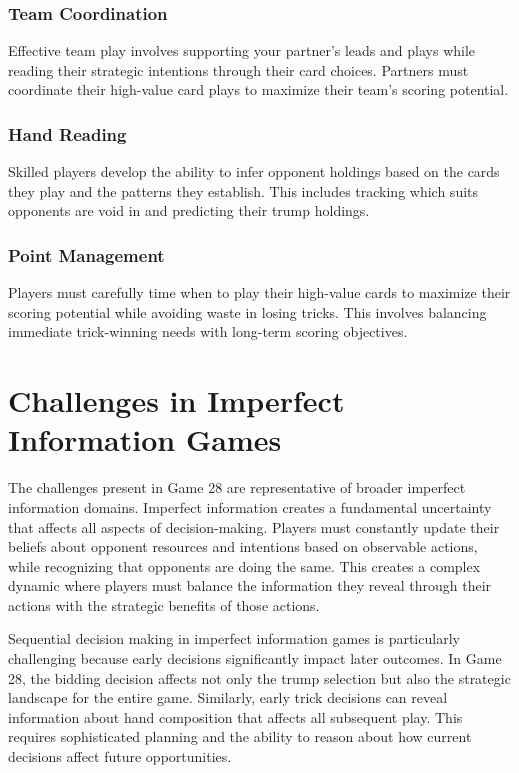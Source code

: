 \documentclass[conference]{IEEEtran}
\begin{document}
\subsubsection{Team Coordination}
Effective team play involves supporting your partner's leads and plays while reading their strategic intentions through their card choices. Partners must coordinate their high-value card plays to maximize their team's scoring potential.


\subsubsection{Hand Reading}
Skilled players develop the ability to infer opponent holdings based on the cards they play and the patterns they establish. This includes tracking which suits opponents are void in and predicting their trump holdings.

\subsubsection{Point Management}
Players must carefully time when to play their high-value cards to maximize their scoring potential while avoiding waste in losing tricks. This involves balancing immediate trick-winning needs with long-term scoring objectives. 


\section{Challenges in Imperfect Information Games}

The challenges present in Game 28 are representative of broader imperfect information domains. Imperfect information creates a fundamental uncertainty that affects all aspects of decision-making. Players must constantly update their beliefs about opponent resources and intentions based on observable actions, while recognizing that opponents are doing the same. This creates a complex dynamic where players must balance the information they reveal through their actions with the strategic benefits of those actions.

Sequential decision making in imperfect information games is particularly challenging because early decisions significantly impact later outcomes. In Game 28, the bidding decision affects not only the trump selection but also the strategic landscape for the entire game. Similarly, early trick decisions can reveal information about hand composition that affects all subsequent play. This requires sophisticated planning and the ability to reason about how current decisions affect future opportunities.
\end{document}
